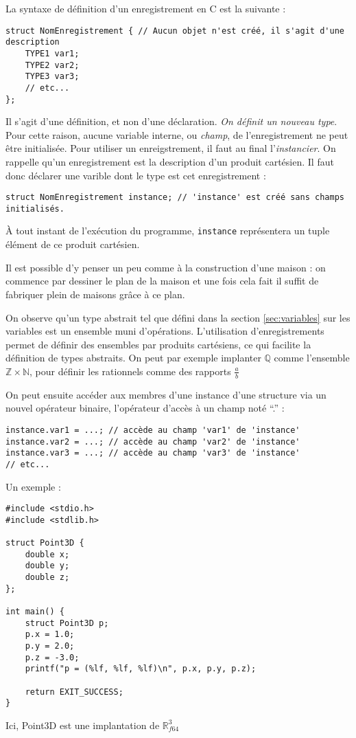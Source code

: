 \documentclass[../../../main.tex]{subfiles}
\begin{document}
La syntaxe de définition d'un enregistrement en C est la suivante :
\begin{verbatim}
struct NomEnregistrement { // Aucun objet n'est créé, il s'agit d'une description
	TYPE1 var1;
	TYPE2 var2;
	TYPE3 var3;
	// etc...
};
\end{verbatim}
Il s'agit d'une définition, et non d'une déclaration. \textit{On définit un nouveau type}. Pour cette raison, aucune variable interne, ou \textit{champ}, de l'enregistrement ne peut être initialisée. Pour utiliser un enreigstrement, il faut au final l'\textit{instancier}. On rappelle qu'un enregistrement est la description d'un produit cartésien. Il faut donc déclarer une varible dont le type est cet enregistrement :
\begin{verbatim}
struct NomEnregistrement instance; // 'instance' est créé sans champs initialisés.
\end{verbatim}
À tout instant de l'exécution du programme, \texttt{instance} représentera un tuple élément de ce produit cartésien.

Il est possible d'y penser un peu comme à la construction d'une maison : on commence par dessiner le plan de la maison et une fois cela fait il suffit de fabriquer plein de maisons grâce à ce plan.

On observe qu'un type abstrait tel que défini dans la section \ref{sec:variables} sur les variables est un ensemble muni d'opérations. L'utilisation d'enregistrements permet de définir des ensembles par produits cartésiens, ce qui facilite la définition de types abstraits. On peut par exemple implanter $\mathbb{Q}$ comme l'ensemble $\mathbb{Z}\times{\mathbb{N}}$, pour définir les rationnels comme des rapports $\frac{a}{b}$

On peut ensuite accéder aux membres d'une instance d'une structure via un nouvel opérateur binaire, l'opérateur d'accès à un champ noté ``.'' :
\begin{verbatim}
instance.var1 = ...; // accède au champ 'var1' de 'instance'
instance.var2 = ...; // accède au champ 'var2' de 'instance'
instance.var3 = ...; // accède au champ 'var3' de 'instance'
// etc...
\end{verbatim}
Un exemple :
\begin{verbatim}
#include <stdio.h>
#include <stdlib.h>

struct Point3D {
	double x;
	double y;
	double z;
};

int main() {
	struct Point3D p;
	p.x = 1.0;
	p.y = 2.0;
	p.z = -3.0;
	printf("p = (%lf, %lf, %lf)\n", p.x, p.y, p.z);

	return EXIT_SUCCESS;
}
\end{verbatim}
Ici, \textsf{Point3D} est une implantation de $\mathbb{R}_{f64}^{3}$
\end{document}
